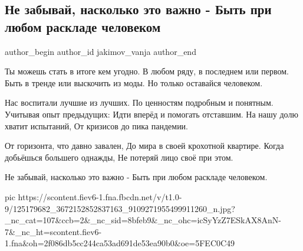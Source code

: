  
 
 
 
 
 
\subsection{Не забывай, насколько это важно - Быть при любом раскладе человеком}
\label{sec:14_11_2020.fb.jakimov_vanja.1.ne_zabyvaj_chelovekom_byt}
\ifcmt
	author_begin
   author_id jakimov_vanja
	author_end
\fi

\begin{multicols}{2}
	\obeycr
Ты можешь стать в итоге кем угодно. 
В любом ряду, в последнем или первом. 
Быть в тренде или выскочить из моды. 
Но только оставайся человеком. 

Нас воспитали лучшие из лучших. 
По ценностям подробным и понятным. Учитывая опыт предыдущих: 
Идти вперёд и помогать отставшим.  
На нашу долю хватит испытаний, 
От кризисов до пика пандемии. 

От горизонта, что давно завален, 
До мира в своей крохотной квартире.  
Когда добьёшься большего однажды, 
Не потеряй лицо своё при этом. 

Не забывай, насколько это важно - 
Быть при любом раскладе человеком.
	\restorecr
\end{multicols}

\ifcmt
pic https://scontent.fiev6-1.fna.fbcdn.net/v/t1.0-9/125179682_3672152852837163_9109271955499911260_n.jpg?_nc_cat=107&ccb=2&_nc_sid=8bfeb9&_nc_ohc=icSyYzZ7ESkAX8AnN-7&_nc_ht=scontent.fiev6-1.fna&oh=2f086db5cc244ca53ad691de53ea90b0&oe=5FEC0C49
\fi
